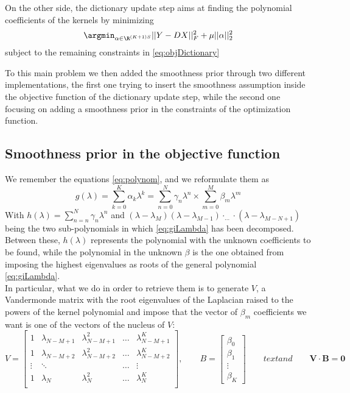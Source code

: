 On the other side, the dictionary update step aims at finding the polynomial coefficients of the kernels by minimizing
\begin{equation}
  \argmin_{\alpha \in \R^{(K+1)S}} ||Y - DX||^2_F + \mu||\alpha||_2^2
\end{equation}
subject to the remaining constraints in \autoref{eq:objDictionary}

To this main problem we then added the smoothness prior through two different implementations, the first one trying to insert the smoothness assumption inside the objective function of the dictionary update step, while the second one focusing on adding a smoothness prior in the constraints of the optimization function.

\subsection{Smoothness prior in the objective function}
We remember the equations \ref{eq:polynom}, and we reformulate them as
\begin{equation}
  g(\lambda) = \sum_{k=0}^K\alpha_k \lambda^k = \sum_{n=0}^N\gamma_n \lambda^n \times \sum_{m=0}^M  \beta_m \lambda^m
  \label{eq:giLambda}
\end{equation}
With $h(\lambda) = \sum_{n=n}^N \gamma_n \lambda^n$ and $(\lambda - \lambda_M)(\lambda - \lambda_{M-1})\cdot_{\dots}\cdot (\lambda - \lambda_{M - N +1})$ being the two sub-polynomials in which \ref{eq:giLambda} has been decomposed. Between these, $h(\lambda)$ represents the polynomial with the unknown coefficients to be found, while the polynomial in the unknown $\beta$ is the one obtained from imposing the highest eigenvalues as roots of the general polynomial \ref{eq:giLambda}.\\
In particular, what we do in order to retrieve them is to generate $V$, a Vandermonde matrix with the root eigenvalues of the Laplacian raised to the powers of the kernel polynomial and impose that the vector of $\beta_m$ coefficients we want is one of the vectors of the nucleus of $V$:
\begin{equation}
V=
\begin{bmatrix}
1 & \lambda_{N-M+1} & \lambda_{N-M+1}^2 & \dots & \lambda_{N-M+1}^K\\
1 & \lambda_{N-M+2} & \lambda_{N-M+2}^2 & \dots & \lambda_{N-M+2}^K\\
\vdots & \ddots     &                   & \dots & \vdots\\
1 & \lambda_N &       \lambda_N^2       & \dots & \lambda_N^K\\
\end{bmatrix}
, \qquad B=
\begin{bmatrix}
\beta_0\\
\beta_1\\
\vdots\\
\beta_K
\end{bmatrix}
\qquad text{and} \qquad \textbf{V}\cdot \textbf{B} = \textbf{0}
\end{equation}

